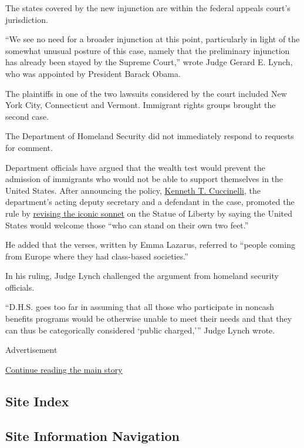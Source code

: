 The states covered by the new injunction are within the federal appeals
court's jurisdiction.

``We see no need for a broader injunction at this point, particularly in
light of the somewhat unusual posture of this case, namely that the
preliminary injunction has already been stayed by the Supreme Court,''
wrote Judge Gerard E. Lynch, who was appointed by President Barack
Obama.

The plaintiffs in one of the two lawsuits considered by the court
included New York City, Connecticut and Vermont. Immigrant rights groups
brought the second case.

The Department of Homeland Security did not immediately respond to
requests for comment.

Department officials have argued that the wealth test would prevent the
admission of immigrants who would not be able to support themselves in
the United States. After announcing the policy,
\href{https://www.nytimes3xbfgragh.onion/2019/09/05/us/politics/ken-cuccinelli-immigration-trump.html}{Kenneth
T. Cuccinelli}, the department's acting deputy secretary and a defendant
in the case, promoted the rule by
\href{https://www.nytimes3xbfgragh.onion/2019/08/14/us/cuccinelli-statue-liberty-poem.html}{revising
the iconic sonnet} on the Statue of Liberty by saying the United States
would welcome those ``who can stand on their own two feet.''

He added that the verses, written by Emma Lazarus, referred to ``people
coming from Europe where they had class-based societies.''

In his ruling, Judge Lynch challenged the argument from homeland
security officials.

``D.H.S. goes too far in assuming that all those who participate in
noncash benefits programs would be otherwise unable to meet their needs
and that they can thus be categorically considered `public charged,'''
Judge Lynch wrote.

Advertisement

\protect\hyperlink{after-bottom}{Continue reading the main story}

\hypertarget{site-index}{%
\subsection{Site Index}\label{site-index}}

\hypertarget{site-information-navigation}{%
\subsection{Site Information
Navigation}\label{site-information-navigation}}


